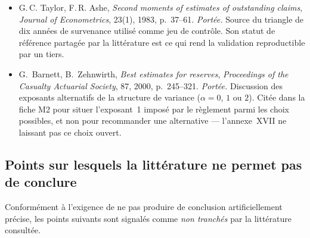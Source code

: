 \documentclass[a4paper,11pt]{article}
\begin{document}
\begin{itemize}[itemsep=4pt]
  \item G.\,C. Taylor, F.\,R. Ashe, \emph{Second moments of estimates of
  outstanding claims}, \emph{Journal of Econometrics}, 23(1), 1983, p.~37--61.
  \emph{Portée.} Source du triangle de dix années de survenance utilisé comme jeu
  de contrôle. Son statut de référence partagée par la littérature est ce qui
  rend la validation reproductible par un tiers.

  \item G.~Barnett, B.~Zehnwirth, \emph{Best estimates for reserves},
  \emph{Proceedings of the Casualty Actuarial Society}, 87, 2000, p.~245--321.
  \emph{Portée.} Discussion des exposants alternatifs de la structure de
  variance ($\alpha = 0$, $1$ ou $2$). Citée dans la fiche M2 pour situer
  l'exposant~1 imposé par le règlement parmi les choix possibles, et non pour
  recommander une alternative --- l'annexe~XVII ne laissant pas ce choix ouvert.
\end{itemize}

\subsection*{Points sur lesquels la littérature ne permet pas de conclure}

Conformément à l'exigence de ne pas produire de conclusion artificiellement
précise, les points suivants sont signalés comme \emph{non tranchés} par la
littérature consultée.
\end{document}
